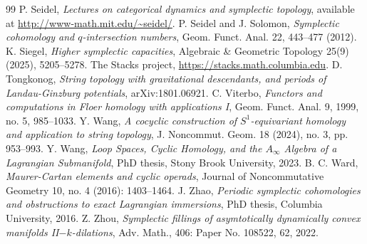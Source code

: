 \documentclass[a4paper]{article}
\numberwithin{equation}{section}
\begin{document}
\begin{thebibliography}{99}
P. Seidel, \textit{Lectures on categorical dynamics and symplectic topology}, available at \url{http://www-math.mit.edu/~seidel/}.
P. Seidel and J. Solomon, \textit{Symplectic cohomology and $q$-intersection numbers}, Geom. Funct. Anal. 22, 443--477 (2012).
K. Siegel, \textit{Higher symplectic capacities}, Algebraic \& Geometric Topology 25(9) (2025), 5205--5278.
The Stacks project, \url{https://stacks.math.columbia.edu}.
D. Tongkonog, \textit{String topology with gravitational descendants, and periods of Landau-Ginzburg potentials}, arXiv:1801.06921.
C. Viterbo, \textit{Functors and computations in Floer homology with applications I}, Geom. Funct. Anal. 9, 1999, no. 5, 985--1033.
Y. Wang, \textit{A cocyclic construction of $S^1$-equivariant homology and application to string topology}, J. Noncommut. Geom. 18 (2024), no. 3, pp. 953--993.
Y. Wang, \textit{Loop Spaces, Cyclic Homology, and the $A_\infty$ Algebra of a Lagrangian Submanifold}, PhD thesis, Stony Brook University, 2023.
B. C. Ward, \textit{Maurer-Cartan elements and cyclic operads}, Journal of Noncommutative Geometry 10, no. 4 (2016): 1403--1464.
J. Zhao, \textit{Periodic symplectic cohomologies and obstructions to exact Lagrangian immersions}, PhD thesis, Columbia University, 2016.
Z. Zhou, \textit{Symplectic fillings of asymtotically dynamically convex manifolds II$-k$-dilations}, Adv. Math., 406: Paper No. 108522, 62, 2022.
\end{thebibliography}

\Addresses
	
\end{document}
